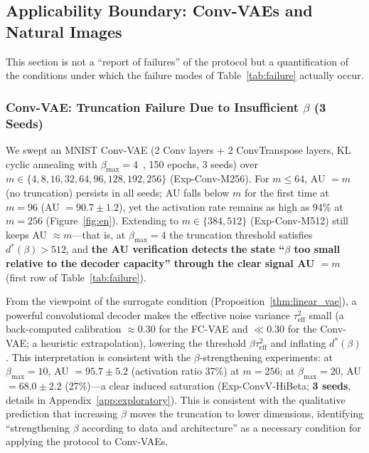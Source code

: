 \documentclass[make,article,submit,pdftex,moreauthors]{Definitions/mdpi}
\newcommand{\dstar}{d^{*}(\beta)}
\begin{document}
\subsection{Applicability Boundary: Conv-VAEs and Natural Images}\label{sec:exp_boundary}

This section is not a ``report of failures'' of the protocol but a
quantification of the conditions under which the failure modes of
Table~\ref{tab:failure} actually occur.

\subsubsection{Conv-VAE: Truncation Failure Due to Insufficient $\beta$ (3 Seeds)}

We swept an MNIST Conv-VAE (2 Conv layers + 2 ConvTranspose layers, KL
cyclic annealing with $\beta_{\max} = 4$~\cite{fu2019cyclical}, 150 epochs,
3 seeds) over $m \in \{4, 8, 16, 32, 64, 96, 128, 192, 256\}$
(Exp-Conv-M256).
For $m \leq 64$, AU $= m$ (no truncation) persists in all seeds; AU falls
below $m$ for the first time at $m = 96$ (AU $= 90.7 \pm 1.2$), yet the
activation rate remains as high as 94\% at $m = 256$
(Figure~\ref{fig:en}).
Extending to $m \in \{384, 512\}$ (Exp-Conv-M512) still keeps
AU $\approx m$---that is, at $\beta_{\max} = 4$ the truncation threshold
satisfies $\dstar > 512$, and \textbf{the AU verification detects the state
``$\beta$ too small relative to the decoder capacity'' through the clear
signal AU $= m$} (first row of Table~\ref{tab:failure}).

From the viewpoint of the surrogate condition
(Proposition~\ref{thm:linear_vae}), a powerful convolutional decoder makes
the effective noise variance $\tau^2_{\mathrm{eff}}$ small (a back-computed
calibration $\approx 0.30$ for the FC-VAE and $\ll 0.30$ for the Conv-VAE; a
heuristic extrapolation), lowering the threshold
$\beta\tau^2_{\mathrm{eff}}$ and inflating $\dstar$.
This interpretation is consistent with the $\beta$-strengthening
experiments: at $\beta_{\max} = 10$, AU $= 95.7 \pm 5.2$ (activation ratio
37\%) at $m = 256$; at $\beta_{\max} = 20$, AU $= 68.0 \pm 2.2$
(27\%)---a clear induced saturation
(Exp-ConvV-HiBeta; \textbf{3 seeds}, details in
Appendix~\ref{app:exploratory}).
This is consistent with the qualitative prediction that increasing $\beta$
moves the truncation to lower dimensions, identifying ``strengthening
$\beta$ according to data and architecture'' as a necessary condition for
applying the protocol to Conv-VAEs.
\end{document}
